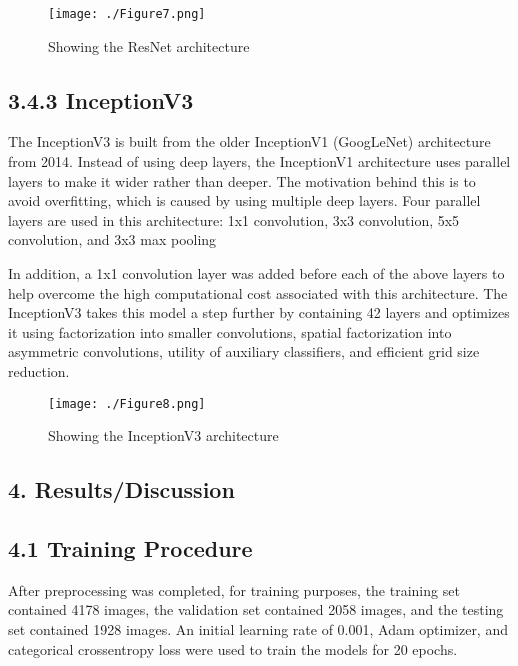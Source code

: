\documentclass[
]{article}
\begin{document}
\begin{figure}[hbt!]
  \centering
  \texttt{[image: ./Figure7.png]}
  \caption{Showing the ResNet architecture}
  \label{fig:figure5}
\end{figure}

\hypertarget{inceptionv3}{%
\subsection{\texorpdfstring{\textbf{3.4.3
InceptionV3}}{3.4.3 InceptionV3}}\label{inceptionv3}}

The InceptionV3 is built from the older InceptionV1 (GoogLeNet)
architecture from 2014. Instead of using deep layers, the InceptionV1
architecture uses parallel layers to make it wider rather than deeper.
The motivation behind this is to avoid overfitting, which is caused by
using multiple deep layers. Four parallel layers are used in this
architecture: 1x1 convolution, 3x3 convolution, 5x5 convolution, and 3x3
max pooling

In addition, a 1x1 convolution layer was added before each of the above
layers to help overcome the high computational cost associated with this
architecture. The InceptionV3 takes this model a step further by
containing 42 layers and optimizes it using factorization into smaller
convolutions, spatial factorization into asymmetric convolutions,
utility of auxiliary classifiers, and efficient grid size reduction.

\begin{figure}[hbt!]
  \centering
  \texttt{[image: ./Figure8.png]}
  \caption{Showing the InceptionV3 architecture}
  \label{fig:figure5}
\end{figure}

\hypertarget{resultsdiscussion}{%
\subsection{\texorpdfstring{\textbf{4. Results/Discussion}}{Results/Discussion}}\label{resultsdiscussion}}

\hypertarget{training-procedure}{%
\subsection{\texorpdfstring{\textbf{4.1 Training
Procedure}}{4.1 Training Procedure}}\label{training-procedure}}

After preprocessing was completed, for training purposes, the training
set contained 4178 images, the validation set contained 2058 images, and
the testing set contained 1928 images. An initial learning rate of
0.001, Adam optimizer, and categorical crossentropy loss were used to
train the models for 20 epochs.
\end{document}
